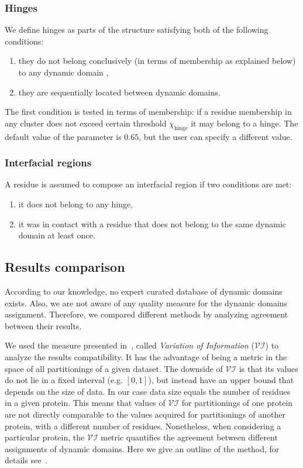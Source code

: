 \documentclass[a4paper,11pt,twoside]{book}%
\begin{document}
\subsubsection*{Hinges}
We define hinges as parts of the structure satisfying both of the following conditions:
\begin{enumerate}
\item they do not belong conclusively (in terms of membership as explained below) to any dynamic domain ,
\item they are sequentially located between dynamic domains.
\end{enumerate}

The first condition is tested in terms of membership: if a residue membership in any cluster does not exceed certain threshold $\chi_\text{hinge}$ it may belong to a hinge. 
The default value of the parameter is $0.65$, but the user can specify a different value.

\subsubsection*{Interfacial regions}
A residue is assumed to compose an interfacial region if two conditions are met:
\begin{enumerate}
\item it does not belong to any hinge,
\item it was in contact with a residue that does not belong to the same dynamic domain at least once.
\end{enumerate}

\subsection*{Results comparison}
According to our knowledge, no expert curated database of dynamic domains exists.
Also, we are not aware of any quality measure for the dynamic domains assignment.
Therefore, we compared different methods by analyzing agreement between their results.

We used the measure presented in~\cite{meilua2007comparing}, called \emph{Variation of Information} ($\mathcal{VI}$) to analyze the results compatibility.
It has the advantage of being a metric in the space of all partitionings of a given dataset.
The downside of $\mathcal{VI}$ is that its values do not lie in a fixed interval (e.g. $[0,1]$), but instead have an upper bound that depends on the size of data.
In our case data size equals the number of residues in a given protein.
This means that values of $\mathcal{VI}$ for partitionings of one protein are not directly comparable to the values acquired for partitionings of another protein, with a different number of residues.
Nonetheless, when considering a particular protein, the $\mathcal{VI}$ metric quantifies the agreement between different assignments of dynamic domains.
Here we give an outline of the method, for details see~\cite{meilua2007comparing}.
\end{document}
